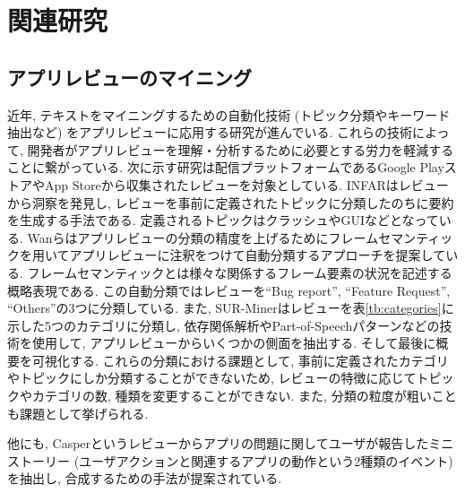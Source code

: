 \chapter{関連研究}
\label{chap:kanrenkenkyuu}





\section{アプリレビューのマイニング}
近年, テキストをマイニングするための自動化技術 (トピック分類やキーワード抽出など)  をアプリレビューに応用する研究が進んでいる. これらの技術によって, 開発者がアプリレビューを理解・分析するために必要とする労力を軽減することに繋がっている. 
次に示す研究は配信プラットフォームであるGoogle PlayストアやApp Storeから収集されたレビューを対象としている. 
INFAR\cite{infar}はレビューから洞察を発見し, レビューを事前に定義されたトピックに分類したのちに要約を生成する手法である. 定義されるトピックはクラッシュやGUIなどとなっている. 
Wanら\cite{dsa}はアプリレビューの分類の精度を上げるためにフレームセマンティックを用いてアプリレビューに注釈をつけて自動分類するアプローチを提案している. フレームセマンティックとは様々な関係するフレーム要素の状況を記述する概略表現である. この自動分類ではレビューを``Bug report'', ``Feature Request'', ``Others''の3つに分類している. 
また, SUR-Miner\cite{sur-miner}はレビューを表\ref{tb:categories}に示した5つのカテゴリに分類し, 依存関係解析やPart-of-Speechパターンなどの技術を使用して, アプリレビューからいくつかの側面を抽出する. そして最後に概要を可視化する. 
これらの分類における課題として, 事前に定義されたカテゴリやトピックにしか分類することができないため, レビューの特徴に応じてトピックやカテゴリの数, 種類を変更することができない. また, 分類の粒度が粗いことも課題として挙げられる. 

他にも, Casper\cite{caspar}というレビューからアプリの問題に関してユーザが報告したミニストーリー (ユーザアクションと関連するアプリの動作という2種類のイベント)  を抽出し, 合成するための手法が提案されている. 

